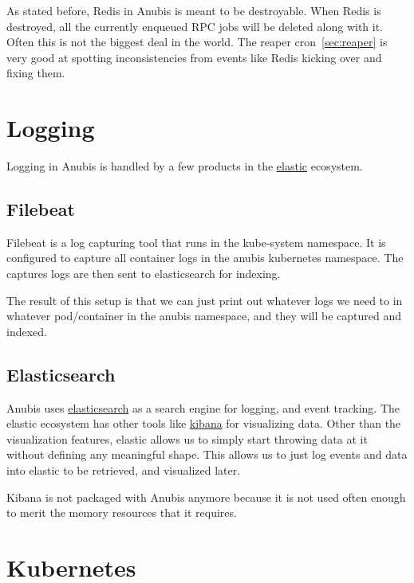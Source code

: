 As stated before, Redis in Anubis is meant to be destroyable.
When Redis is destroyed, all the currently enqueued RPC jobs will be deleted along with it.
Often this is not the biggest deal in the world.
The reaper cron~\ref{sec:reaper} is very good at spotting inconsistencies from events like
Redis kicking over and fixing them.

\section{Logging}\label{sec:logging}

Logging in Anubis is handled by a few products in the \href{https://elastic.co}{elastic} ecosystem.

\subsection{Filebeat}\label{subsec:filebeat}

Filebeat is a log capturing tool that runs in the kube-system namespace.
It is configured to capture all container logs in the anubis kubernetes namespace.
The captures logs are then sent to elasticsearch for indexing.

The result of this setup is that we can just print out whatever logs we need to in
whatever pod/container in the anubis namespace, and they will be captured and indexed.

\subsection{Elasticsearch}\label{subsec:elasticsearch}

Anubis uses \href{https://www.elastic.co/elasticsearch/}{elasticsearch} as a search engine for logging, and event tracking.
The elastic ecosystem has other tools like \href{https://www.elastic.co/kibana/}{kibana} for visualizing data.
Other than the visualization features, elastic allows us to simply start throwing
data at it without defining any meaningful shape. 
This allows us to just log events and data into elastic to be retrieved, and visualized later.

Kibana is not packaged with Anubis anymore because it is not used often enough
to merit the memory resources that it requires.

\section{Kubernetes}\label{sec:kubernetes}

